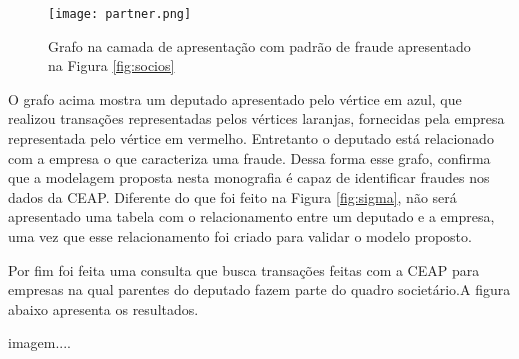 \begin{figure}[H]
\centering
\texttt{[image: partner.png]}
\caption{Grafo na camada de apresentação com padrão de fraude apresentado na Figura \ref{fig:socios}}
\label{fig:partner}
\end{figure}

O grafo acima mostra um deputado apresentado pelo vértice em azul, que realizou transações representadas pelos vértices laranjas, fornecidas pela empresa representada pelo vértice em vermelho. Entretanto o deputado está relacionado com a empresa o que caracteriza uma fraude. Dessa forma esse grafo, confirma que a modelagem proposta nesta monografia é capaz de identificar fraudes nos dados da CEAP. Diferente do que foi feito na Figura \ref{fig:sigma}, não será apresentado uma tabela com o relacionamento entre um deputado e a empresa, uma vez que esse relacionamento foi criado para validar o modelo proposto.

Por fim foi feita uma consulta que busca transações feitas com a CEAP para empresas na qual parentes do deputado fazem parte do quadro societário.A figura abaixo apresenta os resultados.

imagem....